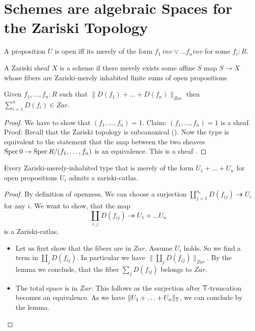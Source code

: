 \section{Schemes are algebraic Spaces for the Zariski Topology}
\begin{definition}
 A proposition $U$ is open iff its merely of the form $f_1 \ inv \lor \hdots f_n inv$ for some $f_i : R$.
\end{definition}
\begin{definition}
	A Zariski sheaf $X$ is a scheme if there merely exists some affine $S$  map $S \to X$ whose fibers are Zariski-merely inhabited finite sums of open propositions 
\end{definition}
\begin{lemma}
	Given $f_1, \hdots,f_n : R$ such that $\| D(f_1) + \hdots + D(f_n) \|_{Zar}$ then $\sum_{i=1}^n D(f_i) \in Zar$.
\end{lemma}
\begin{proof}
	We have to show that $(f_1,\hdots,f_n) = 1$. 
	Claim: 	$(f_1,\hdots,f_n) = 1$ is a sheaf.
	Proof: 
	Recall that the Zariski topology is subcanonical (\todocite). Now the type is equivalent to the statement that the map between the two sheaves $\operatorname{Spec} 0 \to \operatorname{Spec} R/(f_1,\hdots,f_n)$ is an equivalence. This is a sheaf \todocite.
\end{proof}
\begin{prop}
	Every Zariski-merely-inhabited type that is merely of the form $U_1 + \hdots + U_n$ for open propositions $U_i$ admits a zariski-catlas.
\end{prop}
\begin{proof}
	By definition of openness, We can choose a surjection $\coprod_{j=1}^{n_i} D(f_{ij}) \twoheadrightarrow U_i$ for any $i$. We want to show, that the map
	\[
	\coprod_{i , j} D(f_{ij}) \twoheadrightarrow U_1 + \hdots U_n
	\]
	is a Zariski-catlas. 
	\begin{itemize}
		\item Let us first show that the fibers are in $Zar$. Assume $U_i$ holds. So we find a term in $\coprod_j D(f_{ij})$. In particular we have $\| \coprod_j D(f_{ij})\|_{Zar}$. By the lemma we conclude, that the fiber $\sum_j D(f_{ij})$ belongs to $Zar$.\\
		\item The total space is in $Zar$: This follows as the surjection after $\mathbb{T}$-truncation becomes an equivalence. As we have $\| U_1 + \hdots + U_n\|_{\mathbb{T}}$, we can conclude by the lemma.
	\end{itemize}
	
\end{proof}
